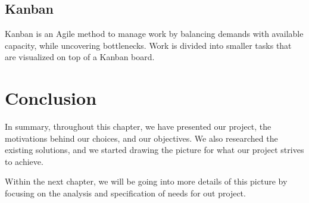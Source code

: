 \subsection{Kanban}

Kanban is an Agile method to manage work by balancing demands with available capacity, while uncovering bottlenecks.
Work is divided into smaller tasks that are visualized on top of a Kanban board.

\section{Conclusion}

In summary, throughout this chapter, we have presented our project, the motivations behind our choices, and our objectives. We also researched the existing solutions, and we started drawing the picture for what our project strives to achieve.

Within the next chapter, we will be going into more details of this picture by focusing on the analysis and specification of needs for out project.